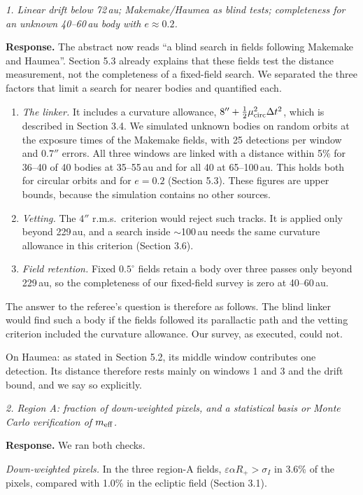 \documentclass[11pt]{article}
\newenvironment{referee}{\par\color{black!60}\itshape}{\par}
\newcommand{\resp}{\par\noindent\textbf{Response.} }
\begin{document}
\begin{referee}
1. Linear drift below 72\,au; Makemake/Haumea as blind tests; completeness for an unknown 40--60\,au body with $e \approx 0.2$.
\end{referee}
\resp The abstract now reads ``a blind search in fields following Makemake and Haumea''. Section 5.3 already explains that these fields test the distance measurement, not the completeness of a fixed-field search. We separated the three factors that limit a search for nearer bodies and quantified each.
\begin{enumerate}
\item \emph{The linker.} It includes a curvature allowance, $8'' + \tfrac12\mu_{\rm circ}^2\Delta t^2$, which is described in Section 3.4. We simulated unknown bodies on random orbits at the exposure times of the Makemake fields, with 25 detections per window and $0.7''$ errors. All three windows are linked with a distance within 5\% for 36--40 of 40 bodies at 35--55\,au and for all 40 at 65--100\,au. This holds both for circular orbits and for $e = 0.2$ (Section 5.3). These figures are upper bounds, because the simulation contains no other sources.
\item \emph{Vetting.} The $4''$ r.m.s.\ criterion would reject such tracks. It is applied only beyond 229\,au, and a search inside $\sim$100\,au needs the same curvature allowance in this criterion (Section 3.6).
\item \emph{Field retention.} Fixed $0.5^\circ$ fields retain a body over three passes only beyond 229\,au, so the completeness of our fixed-field survey is zero at 40--60\,au.
\end{enumerate}
The answer to the referee's question is therefore as follows. The blind linker would find such a body if the fields followed its parallactic path and the vetting criterion included the curvature allowance. Our survey, as executed, could not.

On Haumea: as stated in Section 5.2, its middle window contributes one detection. Its distance therefore rests mainly on windows 1 and 3 and the drift bound, and we say so explicitly.

\begin{referee}
2. Region A: fraction of down-weighted pixels, and a statistical basis or Monte Carlo verification of $m_{\rm eff}$.
\end{referee}
\resp We ran both checks.

\emph{Down-weighted pixels.} In the three region-A fields, $\varepsilon\alpha R_+ > \sigma_I$ in 3.6\% of the pixels, compared with 1.0\% in the ecliptic field (Section 3.1).
\end{document}
